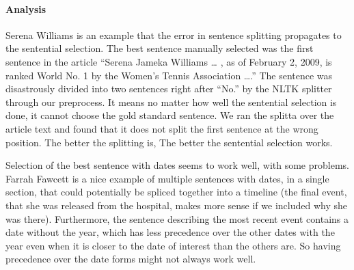 \documentclass[11pt]{article}
\newcommand{\war}[1]{{\sf\small #1}}
\begin{document}
\paragraph {Analysis}

\war{Serena Williams} is an example that the error in sentence splitting
propagates to the sentential selection. The best sentence manually selected
was the first sentence in the article ``Serena Jameka Williams \ldots
, as of February 2, 2009, is ranked World No. 1 by the Women's Tennis
Association \dots .'' The sentence was disastrously divided into two sentences
right after ``No.'' by the NLTK splitter through our preprocess.
It means no matter how well the sentential selection is done,
it cannot choose the gold standard sentence. We ran the splitta
\cite{dgillick09sbd} over the article text and found that it does not
split the first sentence at the wrong position. The better the splitting is,
The better the sentential selection works.

Selection of the best sentence with dates seems to work well,
with some problems.  \war{Farrah Fawcett} is a nice example of multiple sentences
with dates, in a single section, that could potentially be spliced
together into a timeline (the final event, that she was released from
the hospital, makes more sense if we included why she was there).
Furthermore, the sentence describing the most recent event contains
a date without the year, which has less precedence over the other dates with the year
even when it is closer to the date of interest than the others are.
So having precedence over the date forms might not always work well.

%
%
%
%
%
%
%
\end{document}
